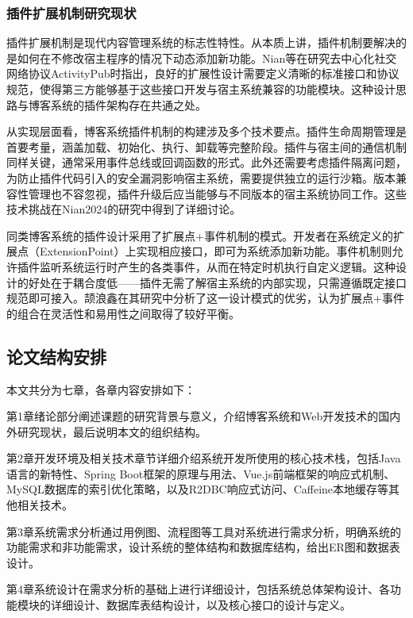 \documentclass[UTF8,AutoFakeBold=1,AutoFakeSlant,zihao=-4]{SCAU}
\begin{document}
 \subsubsection{插件扩展机制研究现状}

 插件扩展机制是现代内容管理系统的标志性特性。从本质上讲，插件机制要解决的是如何在不修改宿主程序的情况下动态添加新功能。Nian等{\citep{Nian2024}}在研究去中心化社交网络协议ActivityPub时指出，良好的扩展性设计需要定义清晰的标准接口和协议规范，使得第三方能够基于这些接口开发与宿主系统兼容的功能模块。这种设计思路与博客系统的插件架构存在共通之处。

 从实现层面看，博客系统插件机制的构建涉及多个技术要点。插件生命周期管理是首要考量，涵盖加载、初始化、执行、卸载等完整阶段。插件与宿主间的通信机制同样关键，通常采用事件总线或回调函数的形式。此外还需要考虑插件隔离问题，为防止插件代码引入的安全漏洞影响宿主系统，需要提供独立的运行沙箱。版本兼容性管理也不容忽视，插件升级后应当能够与不同版本的宿主系统协同工作。这些技术挑战在Nian2024的研究中得到了详细讨论。

 同类博客系统的插件设计采用了扩展点+事件机制的模式。开发者在系统定义的扩展点（ExtensionPoint）上实现相应接口，即可为系统添加新功能。事件机制则允许插件监听系统运行时产生的各类事件，从而在特定时机执行自定义逻辑。这种设计的好处在于耦合度低——插件无需了解宿主系统的内部实现，只需遵循既定接口规范即可接入。颉浪鑫{\citep{颉浪鑫2023}}在其研究中分析了这一设计模式的优劣，认为扩展点+事件的组合在灵活性和易用性之间取得了较好平衡。

 \subsection{论文结构安排}

 本文共分为七章，各章内容安排如下：

 第1章绪论部分阐述课题的研究背景与意义，介绍博客系统和Web开发技术的国内外研究现状，最后说明本文的组织结构。

 第2章开发环境及相关技术章节详细介绍系统开发所使用的核心技术栈，包括Java语言的新特性、Spring Boot框架的原理与用法、Vue.js前端框架的响应式机制、MySQL数据库的索引优化策略，以及R2DBC响应式访问、Caffeine本地缓存等其他相关技术。

 第3章系统需求分析通过用例图、流程图等工具对系统进行需求分析，明确系统的功能需求和非功能需求，设计系统的整体结构和数据库结构，给出ER图和数据表设计。

 第4章系统设计在需求分析的基础上进行详细设计，包括系统总体架构设计、各功能模块的详细设计、数据库表结构设计，以及核心接口的设计与定义。
\end{document}
